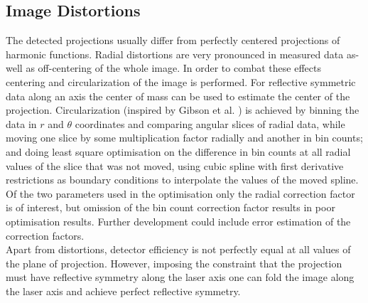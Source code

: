 \documentclass[12pt]{article}
\begin{document}
\subsection{Image Distortions}
The detected projections usually differ from perfectly centered projections of harmonic functions. Radial distortions are very pronounced in measured data as-well as off-centering of the whole image. In order to combat these effects centering and circularization of the image is performed. For reflective symmetric data along an axis the center of mass can be used to estimate the center of the projection. Circularization (inspired by Gibson et al. \cite{gibson_stephen_pyabelpyabel_2022}) is achieved by binning the data in $r$ and $\theta$ coordinates and comparing angular slices of radial data, while moving one slice by some multiplication factor radially and another in bin counts; and doing least square optimisation on the difference in bin counts at all radial values of the slice that was not moved, using cubic spline with first derivative restrictions as boundary conditions to interpolate the values of the moved spline. Of the two parameters used in the optimisation only the radial correction factor is of interest, but omission of the bin count correction factor results in poor optimisation results. Further development could include error estimation of the correction factors.\\
Apart from distortions, detector efficiency is not perfectly equal at all values of the plane of projection. However, imposing the constraint that the projection must have reflective symmetry along the laser axis one can fold the image along the laser axis and achieve perfect reflective symmetry.
\end{document}
